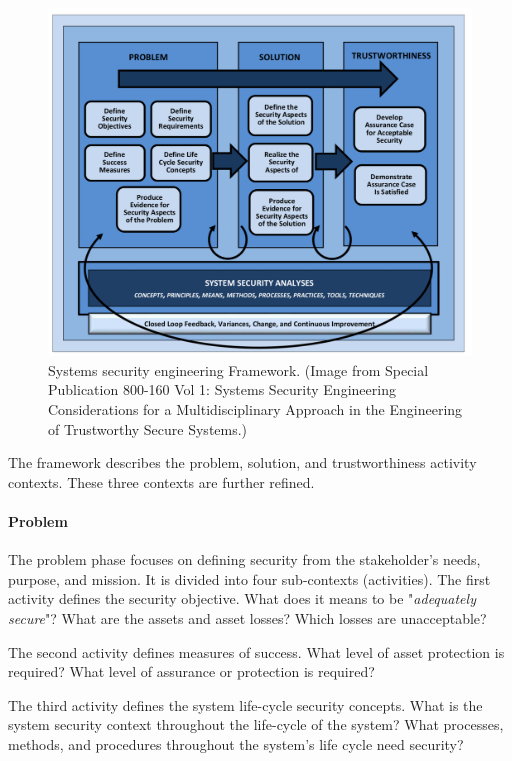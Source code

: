 \documentclass[../../main/main.tex]{subfiles}
\begin{document}
\begin{figure}[h]
\includegraphics[width=\linewidth]{../figures/sseframework}
\caption{\label{sseframework}Systems security engineering Framework. (Image from  Special Publication 800-160 Vol 1: Systems Security Engineering Considerations for a Multidisciplinary Approach in the Engineering of Trustworthy Secure Systems.)}
\end{figure}

The framework describes the problem, solution, and trustworthiness activity contexts.  These three contexts are further refined. 
\paragraph*{Problem}
The problem phase focuses on defining security from the stakeholder's needs, purpose, and mission.  It is divided into four sub-contexts (activities).  The first activity defines the security objective. What does it means to be "\textit{adequately secure}"?   What are the assets and asset losses?  Which losses are unacceptable?
 
The second activity defines measures of success.  What level of asset protection is required?  What level of assurance or protection is required?  

The third activity defines the system life-cycle security concepts.  What is the system security context throughout the life-cycle of the system?  What processes, methods, and procedures throughout the system's life cycle need security?  
\end{document}
